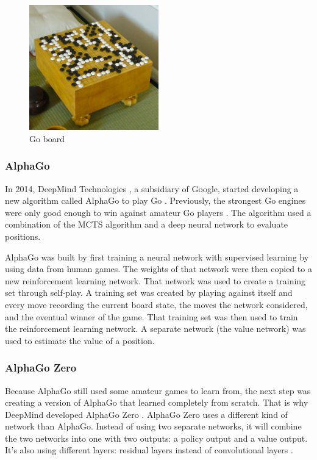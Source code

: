 \documentclass{article}
\begin{document}
\begin{figure}[H]
    \centering
    \includegraphics[width=0.5\textwidth]{img/go.jpg}
    \caption{Go board \cite{GoGame2022}}
\end{figure}

\subsubsection{AlphaGo}

In 2014, DeepMind Technologies \cite{DeepMind2022}, a subsidiary of Google, 
started developing a new algorithm called AlphaGo to play Go \cite{AlphaGo2022a}. 
Previously, the strongest Go engines were only good enough to win against amateur Go players \cite{AlphaGo}.
The algorithm used a combination of the MCTS algorithm and a deep neural network to evaluate positions. 

AlphaGo was built \cite{AlphaGo, MasteringGameGo}  by first training a neural network with supervised learning by using data from human games.
The weights of that network were then copied to a new reinforcement learning network. That network was used to 
create a training set through self-play. A training set was created by playing against itself and every move 
recording the current board state, the  moves the network considered, and the eventual winner of the game.
That training set was then used to train the reinforcement learning network. A separate network (the value network) 
was used to estimate the value of a position. 

\subsubsection{AlphaGo Zero}

Because AlphaGo still used some amateur games to learn from, the next step was creating a version of AlphaGo
that learned completely from scratch. That is why DeepMind developed AlphaGo Zero \cite{AlphaGoZero2022}.
AlphaGo Zero uses a different kind of network than AlphaGo. Instead of using two separate networks, 
it will combine the two networks into one with two outputs: a policy output and a value output.
It's also using different layers: residual layers instead of convolutional layers \cite{MasteringGameZero}. 
\end{document}
